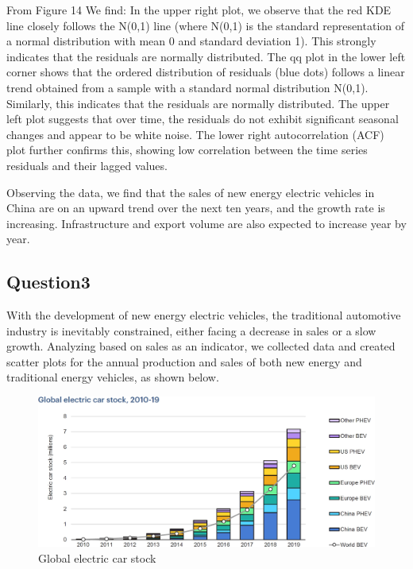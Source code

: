 \documentclass{apmcmthesis}
\begin{document}
From Figure 14 We find: In the upper right plot, we observe that the red KDE line closely follows the N(0,1) line (where N(0,1) is the standard representation of a normal distribution with mean 0 and standard deviation 1). This strongly indicates that the residuals are normally distributed. The qq plot in the lower left corner shows that the ordered distribution of residuals (blue dots) follows a linear trend obtained from a sample with a standard normal distribution N(0,1). Similarly, this indicates that the residuals are normally distributed. The upper left plot suggests that over time, the residuals do not exhibit significant seasonal changes and appear to be white noise. The lower right autocorrelation (ACF) plot further confirms this, showing low correlation between the time series residuals and their lagged values.

Observing the data, we find that the sales of new energy electric vehicles in China are on an upward trend over the next ten years, and the growth rate is increasing. Infrastructure and export volume are also expected to increase year by year.


\subsection{Question3}

With the development of new energy electric vehicles, the traditional automotive industry is inevitably constrained, either facing a decrease in sales or a slow growth. Analyzing based on sales as an indicator, we collected data and created scatter plots for the annual production and sales of both new energy and traditional energy vehicles, as shown below.

\begin{figure}[htbp]
    \centering
    \includegraphics[scale=0.7]{figures/Figure/Global_electric car stock.jpg}
    \caption{Global electric car stock}
\end{figure}
\end{document}
